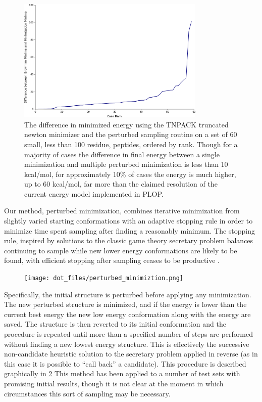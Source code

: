 \begin{figure}
\centering
\includegraphics[width=0.8\textwidth,height=0.8\textheight,keepaspectratio]{figures/brownian_sampling.png}
\caption{The difference in minimized energy using the TNPACK truncated newton minimizer and the perturbed sampling routine on a set of 60 small, less than 100 residue, peptides, ordered by rank.
Though for a majority of cases the difference in final energy between a single minimization and multiple perturbed minimization is less than 10 kcal/mol, for approximately 10\% of cases the energy is much higher, up to 60 kcal/mol, far more than the claimed resolution of the current energy model implemented in PLOP.}
\label{figure:brownian_results}
\end{figure}

Our method, perturbed minimization, combines iterative minimization from slightly varied starting conformations with an adaptive stopping rule in order to minimize time spent sampling after finding a reasonably minimum.
The stopping rule, inspired by solutions to the classic game theory secretary problem balances continuing to sample while new lower energy conformations are likely to be found, with efficient stopping after sampling ceases to be productive \cite{freeman1983secretary,chow1964optimal}.

\begin{figure}
\centering
\texttt{[image: dot\_files/perturbed\_minimiztion.png]}
\caption{}
\label{figure:perturbed_minimization_flowchart}
\end{figure}

Specifically, the initial structure is perturbed before applying any minimization.
The new perturbed structure is minimized, and if the energy is lower than the current best energy the new low energy conformation along with the energy are saved.
The structure is then reverted to its initial conformation and the procedure is repeated until more than a specified number of steps are performed without finding a new lowest energy structure.
This is effectively the successive non-candidate heuristic solution to the secretary problem applied in reverse (as in this case it is possible to ``call back'' a candidate).
This procedure is described graphically in \ref{figure:perturbed_minimization_flowchart}
This method has been applied to a number of test sets with promising initial results, though it is not clear at the moment in which circumstances this sort of sampling may be necessary.
